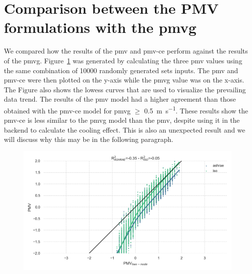 \appendix

\section{Comparison between the PMV formulations with the \ac{pmvg}}\label{sec:comparison-between-the-pmv-formulations-with-the-two-node-model}
We compared how the results of the \ac{pmv} and \ac{pmv-ce} perform against the results of the \ac{pmvg}.
Figure~\ref{fig:pmv_two_node_comparison} was generated by calculating the three \ac{pmv} values using the same combination of \num{10000} randomly generated sets inputs.
The \ac{pmv} and \ac{pmv-ce} were then plotted on the y-axis while the \ac{pmvg} value was on the x-axis.
The Figure also shows the \ac{lowess} curves that are used to visualize the prevailing data trend.
The results of the \ac{pmv} model had a higher agreement than those obtained with the \ac{pmv-ce} model for \ac{pmvg} $\geq$ \qty{0.5}{\m\per\s}.
These results show the \ac{pmv-ce} is less similar to the \ac{pmvg} model than the \ac{pmv}, despite using it in the backend to calculate the cooling effect.
This is also an unexpected result and we will discuss why this may be in the following paragraph.

\begin{figure}[htb!]
    \centering
    \includegraphics[width=\textwidth]{figures/pmv_two_node_comparison}
    \caption{}
    \label{fig:pmv_two_node_comparison}
\end{figure}